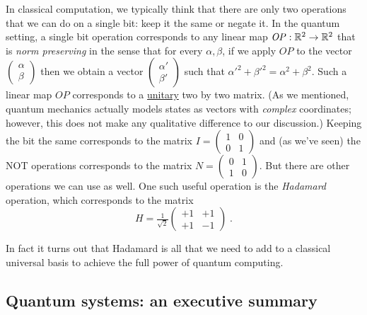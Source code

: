 In classical computation, we typically think that there are only two
operations that we can do on a single bit: keep it the same or negate
it. In the quantum setting, a single bit operation corresponds to any
linear map \(\mathit{OP}:{\mathbb{R}}^2 \rightarrow {\mathbb{R}}^2\) that is
\emph{norm preserving} in the sense that for every \(\alpha,\beta\), if
we apply \(\ensuremath{\mathit{OP}}\) to the vector
\(\begin{pmatrix} \alpha \\ \beta \end{pmatrix}\) then we obtain a
vector \(\begin{pmatrix} \alpha' \\ \beta' \end{pmatrix}\) such that
\(\alpha'^2 + \beta'^2 = \alpha^2 + \beta^2\). Such a linear map
\(\ensuremath{\mathit{OP}}\) corresponds to a
\href{https://en.wikipedia.org/wiki/Unitary_matrix}{unitary} two by two
matrix. (As we mentioned, quantum mechanics actually models states as
vectors with \emph{complex} coordinates; however, this does not make any
qualitative difference to our discussion.) Keeping the bit the same
corresponds to the matrix
\(I = \begin{pmatrix} 1&0\\ 0&1 \end{pmatrix}\) and (as we've seen) the
NOT operations corresponds to the matrix
\(N = \begin{pmatrix} 0&1\\ 1&0 \end{pmatrix}\). But there are other
operations we can use as well. One such useful operation is the
\emph{Hadamard} operation, which corresponds to the matrix
\[H = \tfrac{1}{\sqrt{2}} \begin{pmatrix} +1 & +1\\ +1 & -1 \end{pmatrix} \;. \]

In fact it turns out that Hadamard is all that we need to add to a
classical universal basis to achieve the full power of quantum
computing.

\subsection{Quantum systems: an executive
summary}\label{Quantum-systems-an-execut}

